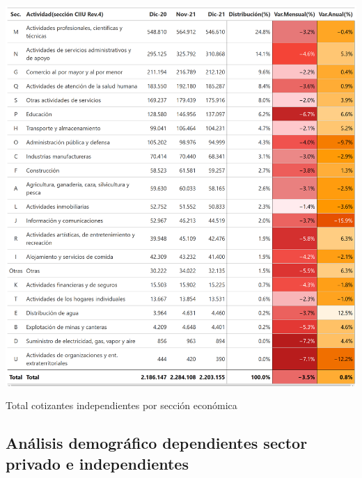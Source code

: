 \begin{table}[!htbp]
\centering
\includegraphics[width = 15cm]{results/02_longitudinal/salida_act_econ_independientes_21.png}
\caption{Total cotizantes independientes por sección económica}%
\label{tabla:independientes:actividad_economica_mes_interes_21}
\end{table}

\FloatBarrier
\subsection{Análisis demográfico dependientes sector privado e independientes}

